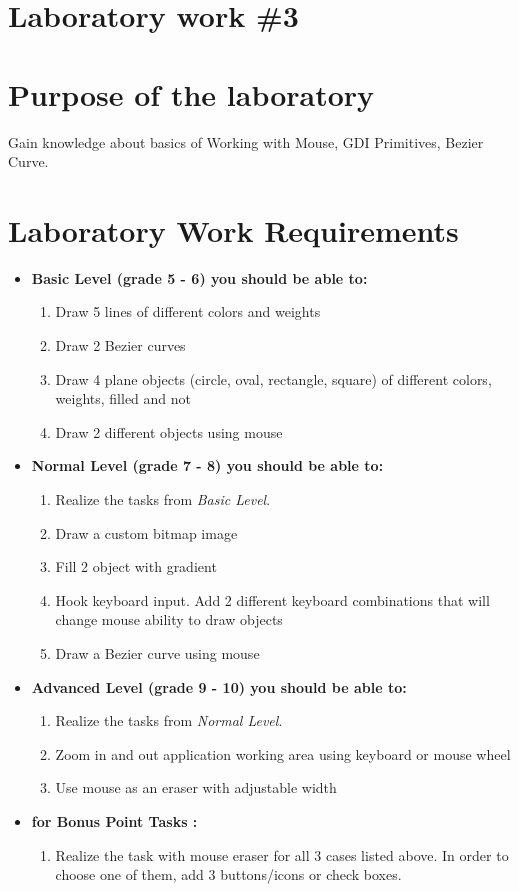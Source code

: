 \section*{Laboratory work \#3}

\section{Purpose of the laboratory}
Gain knowledge about basics of Working with Mouse, GDI Primitives, Bezier Curve.
\section{Laboratory Work Requirements}
\begin{itemize}
\item \textbf{Basic Level (grade 5 - 6) you should be able to:}
	\begin{enumerate}
	\item Draw 5 lines of different colors and weights
      \item Draw 2 Bezier curves
      \item Draw 4 plane objects (circle, oval, rectangle, square) of different colors, weights, filled and not
      \item Draw 2 different objects using mouse
      \end{enumerate}
\item \textbf{Normal Level (grade 7 - 8) you should be able to:}
      \begin{enumerate}
    \item Realize the tasks from \textit{Basic Level}.
    \item Draw a custom bitmap image
    \item Fill 2 object with gradient
    \item Hook keyboard input. Add 2 different keyboard combinations that will change mouse ability to draw objects
    \item Draw a Bezier curve using mouse
    \end{enumerate}
\item \textbf{Advanced Level (grade 9 - 10) you should be able to:}
      \begin{enumerate}
    \item Realize the tasks from \textit{Normal Level}.
    \item Zoom in and out application working area using keyboard or mouse wheel
    \item Use mouse as an eraser with adjustable width
          \end{enumerate}
          \item \textbf{for Bonus Point Tasks :}
          \begin{enumerate}
          \item Realize the task with mouse eraser for all 3 cases listed above. In order to choose one of them, add 3 buttons/icons or check boxes.
          \end{enumerate}
          
  \end{itemize}  

\clearpage